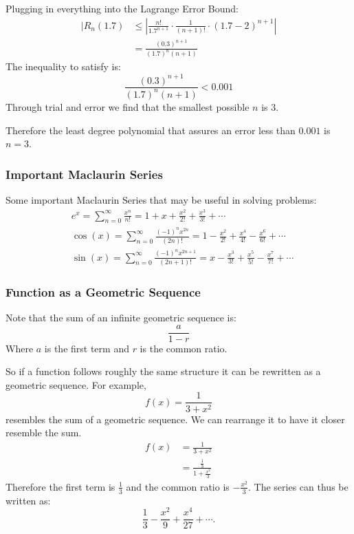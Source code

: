 \documentclass[12pt]{article}
\begin{document}
\begin{enumerate}
                    Plugging in everything into the Lagrange Error Bound:
                    \begin{align*}
                        |R_n(1.7) &\le \left| \frac{n!}{1.7^{n+1}} \cdot \frac{1}{(n+1)!} \cdot (1.7-2)^{n+1} \right| \\[6pt]
                        &= \frac{(0.3)^{n+1}}{(1.7)^n (n+1)}
                    \end{align*}
                    The inequality to satisfy is:
                    \[ \frac{(0.3)^{n+1}}{(1.7)^n (n+1)} < 0.001 \]
                    Through trial and error we find that the smallest possible $n$ is $3$.

                    Therefore the least degree polynomial that assures an error less than $0.001$ is $n=3$.
                \end{enumerate}

            \subsubsection{Important Maclaurin Series}
                \noindent Some important Maclaurin Series that may be useful in solving problems:
                \begin{align*}
                    &e^x = \sum_{n=0}^\infty \frac{x^n}{n!} = 1 + x + \frac{x^2}{2!} + \frac{x^3}{3!} + \cdots \\[6pt]
                    &\cos(x) = \sum_{n=0}^\infty \frac{(-1)^n x^{2n}}{(2n)!} = 1 - \frac{x^2}{2!} + \frac{x^4}{4!} - \frac{x^6}{6!} + \cdots \\[6pt]
                    &\sin(x) = \sum_{n=0}^\infty \frac{(-1)^n x^{2n+1}}{(2n+1)!} = x - \frac{x^3}{3!} + \frac{x^5}{5!} - \frac{x^7}{7!} + \cdots
                \end{align*}

            \subsubsection{Function as a Geometric Sequence}
                \noindent Note that the sum of an infinite geometric sequence is:
                \[ \frac{a}{1-r} \]
                Where $a$ is the first term and $r$ is the common ratio.

                \noindent So if a function follows roughly the same structure it can be rewritten as a geometric sequence. For example,
                \[ f(x) = \frac{1}{3+x^2} \]
                resembles the sum of a geometric sequence. We can rearrange it to have it closer resemble the sum.
                \begin{align*}
                    f(x) &= \frac{1}{3+x^2} \\[6pt]
                    &= \frac{\frac{1}{3}}{1 + \frac{x^2}{3}}
                \end{align*}
                Therefore the first term is $\frac{1}{3}$ and the common ratio is $-\frac{x^2}{3}$. The series can thus be written as:
                \[ \frac{1}{3} - \frac{x^2}{9} + \frac{x^4}{27} + \cdots. \]
\end{document}
